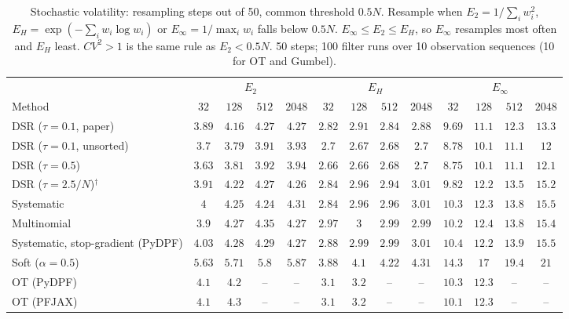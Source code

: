 \begin{table}[ht]
\centering
\small
\caption{Stochastic volatility: resampling steps out of 50, common threshold $0.5N$. Resample when $E_2=1/\sum_iw_i^2$, $E_H=\exp(-\sum_iw_i\log w_i)$ or $E_\infty=1/\max_iw_i$ falls below $0.5N$. $E_\infty\le E_2\le E_H$, so $E_\infty$ resamples most often and $E_H$ least. $CV^2>1$ is the same rule as $E_2<0.5N$. 50 steps; 100 filter runs over 10 observation sequences (10 for OT and Gumbel).}
\label{tab:trigger-fixed-volatility-resampling_steps}
\begin{adjustbox}{max width=\linewidth}
\begin{tabular}{lcccc|cccc|cccc}
\toprule
 & \multicolumn{4}{c}{$E_2$} & \multicolumn{4}{c}{$E_H$} & \multicolumn{4}{c}{$E_\infty$} \\
\cmidrule(lr){2-5} \cmidrule(lr){6-9} \cmidrule(lr){10-13}
Method & $32$ & $128$ & $512$ & $2048$ & $32$ & $128$ & $512$ & $2048$ & $32$ & $128$ & $512$ & $2048$ \\
\midrule
DSR ($\tau{=}0.1$, paper) & $3.89$ & $4.16$ & $4.27$ & $4.27$ & $2.82$ & $2.91$ & $2.84$ & $2.88$ & $9.69$ & $11.1$ & $12.3$ & $13.3$ \\
DSR ($\tau{=}0.1$, unsorted) & $3.7$ & $3.79$ & $3.91$ & $3.93$ & $2.7$ & $2.67$ & $2.68$ & $2.7$ & $8.78$ & $10.1$ & $11.1$ & $12$ \\
DSR ($\tau{=}0.5$) & $3.63$ & $3.81$ & $3.92$ & $3.94$ & $2.66$ & $2.66$ & $2.68$ & $2.7$ & $8.75$ & $10.1$ & $11.1$ & $12.1$ \\
DSR ($\tau{=}2.5/N$)$^\dagger$ & $3.91$ & $4.22$ & $4.27$ & $4.26$ & $2.84$ & $2.96$ & $2.94$ & $3.01$ & $9.82$ & $12.2$ & $13.5$ & $15.2$ \\
\midrule
Systematic & $4$ & $4.25$ & $4.24$ & $4.31$ & $2.84$ & $2.96$ & $2.96$ & $3.01$ & $10.3$ & $12.3$ & $13.8$ & $15.5$ \\
Multinomial & $3.9$ & $4.27$ & $4.35$ & $4.27$ & $2.97$ & $3$ & $2.99$ & $2.99$ & $10.2$ & $12.4$ & $13.8$ & $15.4$ \\
Systematic, stop-gradient (PyDPF) & $4.03$ & $4.28$ & $4.29$ & $4.27$ & $2.88$ & $2.99$ & $2.99$ & $3.01$ & $10.4$ & $12.2$ & $13.9$ & $15.5$ \\
Soft ($\alpha{=}0.5$) & $5.63$ & $5.71$ & $5.8$ & $5.87$ & $3.88$ & $4.1$ & $4.22$ & $4.31$ & $14.3$ & $17$ & $19.4$ & $21$ \\
OT (PyDPF) & $4.1$ & $4.2$ & -- & -- & $3.1$ & $3.2$ & -- & -- & $10.3$ & $12.3$ & -- & -- \\
OT (PFJAX) & $4.1$ & $4.3$ & -- & -- & $3.1$ & $3.2$ & -- & -- & $10.1$ & $12.3$ & -- & -- \\

\end{tabular}
\end{adjustbox}
\end{table}
